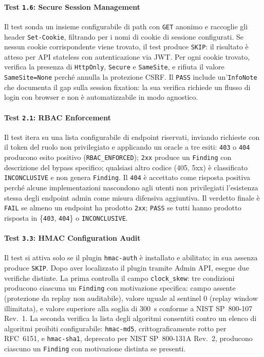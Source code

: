 \paragraph{Test \texttt{1.6}: Secure Session Management}
Il test sonda un insieme configurabile di path con \texttt{GET} anonimo e raccoglie gli header \texttt{Set-Cookie}, filtrando per i nomi di cookie di sessione configurati. Se nessun cookie corrispondente viene trovato, il test produce \texttt{SKIP}: il risultato è atteso per \gls{API} stateless con autenticazione via \gls{JWT}. Per ogni cookie trovato, verifica la presenza di \texttt{HttpOnly}, \texttt{Secure} e \texttt{SameSite}, e rifiuta il valore \texttt{SameSite=None} perché annulla la protezione CSRF.
Il \texttt{PASS} include un'\texttt{InfoNote} che documenta il gap sulla session fixation: la sua verifica richiede un flusso di login con browser e non è automatizzabile in modo agnostico.

\paragraph{Test \texttt{2.1}: RBAC Enforcement}
Il test itera su una lista configurabile di endpoint riservati, inviando richieste con il token del ruolo non privilegiato e applicando un oracle a tre esiti: \texttt{403} o \texttt{404} producono esito positivo (\texttt{RBAC\_ENFORCED}); \texttt{2xx} produce un \texttt{Finding} con descrizione del bypass specifico; qualsiasi altro codice (405, 5xx) è classificato \texttt{INCONCLUSIVE} e non genera \texttt{Finding}. Il \texttt{404} è accettato come risposta positiva perché alcune implementazioni nascondono agli utenti non privilegiati l'esistenza stessa degli endpoint admin come misura difensiva aggiuntiva. Il verdetto finale è \texttt{FAIL} se almeno un endpoint ha prodotto \texttt{2xx}; \texttt{PASS} se tutti hanno prodotto risposta in \{\texttt{403}, \texttt{404}\} o \texttt{INCONCLUSIVE}.

\paragraph{Test \texttt{3.3}: HMAC Configuration Audit}
Il test si attiva solo se il plugin \texttt{hmac-auth} è installato e abilitato; in sua assenza produce \texttt{SKIP}. Dopo aver localizzato il plugin tramite Admin \gls{API}, esegue due verifiche distinte. La prima controlla il campo \texttt{clock\_skew}: tre condizioni producono ciascuna un \texttt{Finding} con motivazione specifica: campo assente (protezione da replay non auditabile), valore uguale al sentinel 0 (replay window illimitata), e valore superiore alla soglia di 300~s conforme a \gls{NIST} SP~800-107 Rev.~1. La seconda verifica la lista degli algoritmi consentiti contro un elenco di algoritmi proibiti configurabile: \texttt{hmac-md5}, crittograficamente rotto per RFC~6151, e \texttt{hmac-sha1}, deprecato per \gls{NIST} SP~800-131A Rev.~2, producono ciascuno un \texttt{Finding} con motivazione distinta se presenti.



